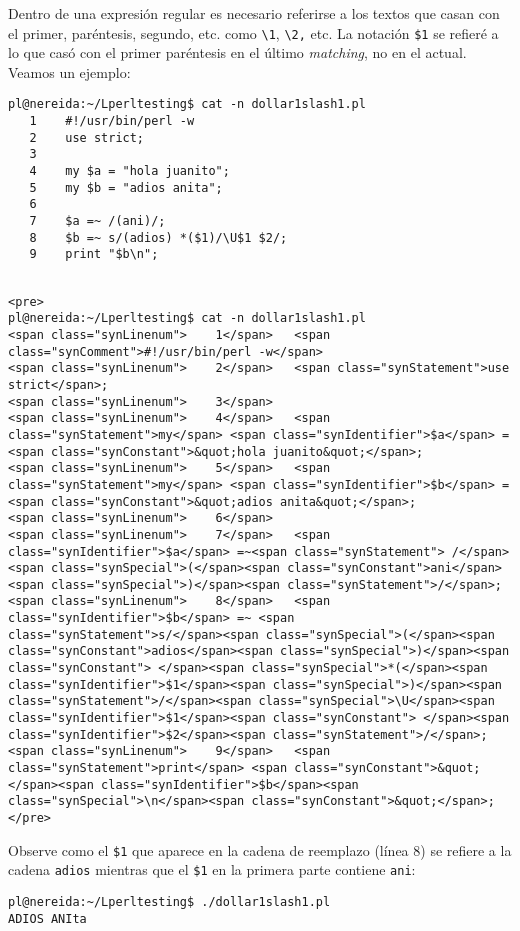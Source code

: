 \label{section:dolar1}
Dentro de una expresión regular es necesario 
referirse a los textos que casan con el primer, paréntesis,
segundo, etc. como \verb|\1|, \verb|\2,| etc. La notación 
\verb|$1| se refieré a lo que casó con el primer paréntesis
en el último \emph{matching}, no en el actual. Veamos un ejemplo:

\begin{latexonly}
\begin{verbatim}
pl@nereida:~/Lperltesting$ cat -n dollar1slash1.pl
   1    #!/usr/bin/perl -w
   2    use strict;
   3  
   4    my $a = "hola juanito";
   5    my $b = "adios anita";
   6  
   7    $a =~ /(ani)/;
   8    $b =~ s/(adios) *($1)/\U$1 $2/;
   9    print "$b\n";
\end{verbatim}
\end{latexonly}
\begin{verbatim}

<pre>
pl@nereida:~/Lperltesting$ cat -n dollar1slash1.pl
<span class="synLinenum">    1</span>   <span class="synComment">#!/usr/bin/perl -w</span>
<span class="synLinenum">    2</span>   <span class="synStatement">use strict</span>;
<span class="synLinenum">    3</span> 
<span class="synLinenum">    4</span>   <span class="synStatement">my</span> <span class="synIdentifier">$a</span> = <span class="synConstant">&quot;hola juanito&quot;</span>;
<span class="synLinenum">    5</span>   <span class="synStatement">my</span> <span class="synIdentifier">$b</span> = <span class="synConstant">&quot;adios anita&quot;</span>;
<span class="synLinenum">    6</span> 
<span class="synLinenum">    7</span>   <span class="synIdentifier">$a</span> =~<span class="synStatement"> /</span><span class="synSpecial">(</span><span class="synConstant">ani</span><span class="synSpecial">)</span><span class="synStatement">/</span>;
<span class="synLinenum">    8</span>   <span class="synIdentifier">$b</span> =~ <span class="synStatement">s/</span><span class="synSpecial">(</span><span class="synConstant">adios</span><span class="synSpecial">)</span><span class="synConstant"> </span><span class="synSpecial">*(</span><span class="synIdentifier">$1</span><span class="synSpecial">)</span><span class="synStatement">/</span><span class="synSpecial">\U</span><span class="synIdentifier">$1</span><span class="synConstant"> </span><span class="synIdentifier">$2</span><span class="synStatement">/</span>;
<span class="synLinenum">    9</span>   <span class="synStatement">print</span> <span class="synConstant">&quot;</span><span class="synIdentifier">$b</span><span class="synSpecial">\n</span><span class="synConstant">&quot;</span>;
</pre>

\end{verbatim}
Observe como el \verb|$1| que aparece en la cadena de reemplazo (línea 8)
se refiere a la cadena \verb|adios|
mientras que el \verb|$1| en la primera parte contiene \verb|ani|:
\begin{verbatim}
pl@nereida:~/Lperltesting$ ./dollar1slash1.pl
ADIOS ANIta
\end{verbatim}

